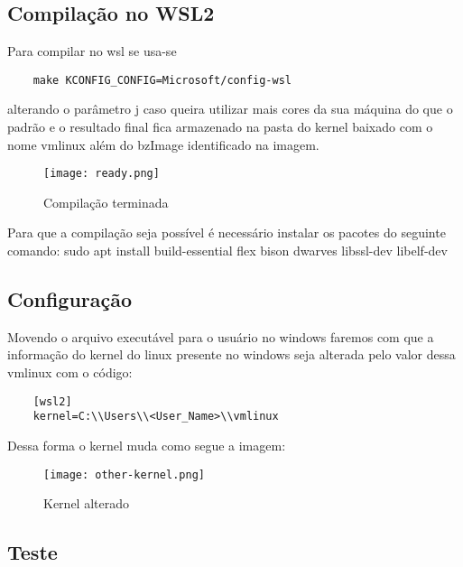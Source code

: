 \documentclass[a4paper, 12pt]{article}
\begin{document}
\newpage

\subsection{Compilação no WSL2}

Para compilar no wsl se usa-se  
\begin{lstlisting} 
    make KCONFIG_CONFIG=Microsoft/config-wsl 
\end{lstlisting} alterando o parâmetro j caso queira utilizar mais cores da sua máquina do que o padrão e o resultado final fica armazenado na pasta do kernel baixado com o nome vmlinux além do bzImage identificado na imagem.

\begin{figure}[!h]
\centering 
\texttt{[image: ready.png]}
\label{figura:qualquernome}
\caption{Compilação terminada}
\end{figure}

Para que a compilação seja possível é necessário instalar os pacotes do seguinte comando: sudo apt install build-essential flex bison dwarves libssl-dev libelf-dev

\newpage

\subsection{Configuração}

Movendo o arquivo executável para o usuário no windows faremos com que a informação do kernel do linux presente no windows seja alterada pelo valor dessa vmlinux com o código:

\begin{lstlisting} 
    [wsl2]
    kernel=C:\\Users\\<User_Name>\\vmlinux 
\end{lstlisting}

Dessa forma o kernel muda como segue a imagem:

\newpage

\begin{figure}[!h]
\centering 
\texttt{[image: other-kernel.png]}
\label{figura:qualquernome}
\caption{Kernel alterado}
\end{figure}

\subsection{Teste}
\end{document}
